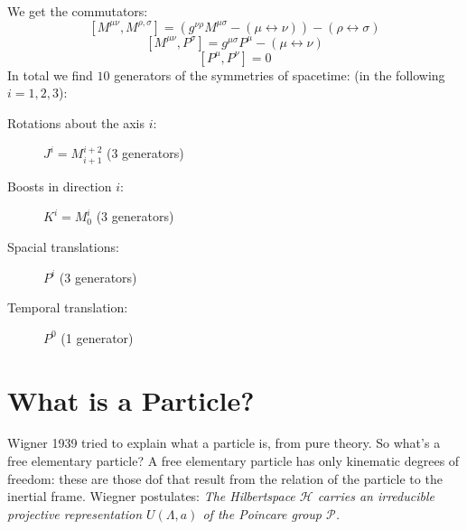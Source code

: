 \documentclass{report}
\begin{document}
We get the commutators: \[
  [M^{\mu\nu}, M^{\rho, \sigma}] = \left( g^{\nu \rho} M^{\mu \sigma} - \left( \mu \leftrightarrow \nu \right)  \right) - \left( \rho \leftrightarrow \sigma \right) 
\] \[
[M^{\mu\nu}, P^\sigma] = g^{\mu \sigma} P^\mu - \left( \mu \leftrightarrow \nu \right) 
\] \[
[P^\mu, P^\nu] = 0
\] 
In total we find $10$ generators of the symmetries of spacetime: (in the following $i = 1,2,3$):
\begin{description}
  \item[Rotations about the axis $i$:] $J^i = M_{i+1}^{i+2}$ (3 generators)
  \item[Boosts in direction  $i$:] $K^i = M_0^i$ (3 generators)
  \item[Spacial translations:]  $P^i$ (3 generators)
  \item[Temporal translation:]  $P^0$ (1 generator)
\end{description}
\section{What is a Particle?}
Wigner 1939 tried to explain what a particle is, from pure theory. So what's a free elementary particle? A free elementary particle has only kinematic degrees of freedom: these are those dof that result from the relation of the particle to the inertial frame. Wiegner postulates: \emph{The Hilbertspace $\mathcal{H}$ carries an irreducible projective representation $U\left( \Lambda, a \right) $ of the Poincare group $\mathcal{P}$.
}\\
\end{document}
